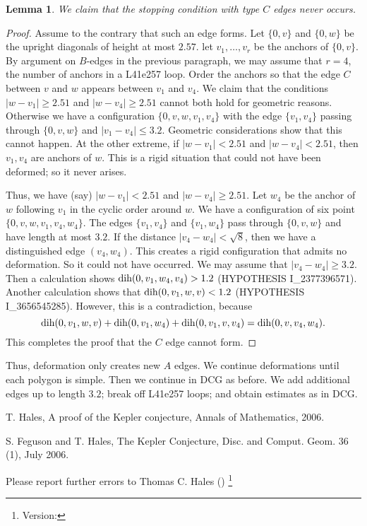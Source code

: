 \documentclass[11pt]{amsart}
\def\op#1{{\text{#1}}}
\def\text{\hbox}
\newtheorem{lemma}[subsubsection]{Lemma}
\begin{document}
\begin{lemma}
We claim that the stopping condition with type $C$ edges never
occurs.
\end{lemma}

\begin{proof}
Assume to the contrary that such an edge forms.
Let $\{0,v\}$ and $\{0,w\}$ be the upright diagonals of height at most
$2.57$.  let $v_1,\ldots,v_r$ be the anchors of $\{0,v\}$.  By argument on $B$-edges in the previous
paragraph, we may assume that $r=4$, the number of anchors in a L41e257 loop.  Order the anchors so
that the edge $C$ between $v$ and $w$ appears
between $v_1$ and $v_4$.  We claim that the
conditions $|w-v_1|\ge 2.51$ and $|w-v_4|\ge 2.51$ cannot
both hold for geometric reasons.
Otherwise we have a configuration $\{0,v,w,v_1,v_4\}$ with the edge $\{v_1,v_4\}$ passing through $\{0,v,w\}$ and $|v_1-v_4|\le 3.2$.  Geometric considerations show that this cannot happen.  At the other extreme, if $|w-v_1|<2.51$ and $|w-v_4|<2.51$, then $v_1,v_4$ are anchors of $w$.  This is a rigid situation that could not have been deformed; so it never arises.  

Thus, we have (say) $|w-v_1|<2.51$ and $|w-v_4|\ge 2.51$.  Let $w_4$ be the anchor of $w$ following $v_1$ in the cyclic order around $w$.
We have a configuration of six point $\{0,v,w,v_1,v_4,w_4\}$.  The edges $\{v_1,v_4\}$ and $\{v_1,w_4\}$ pass through $\{0,v,w\}$ and have length at most $3.2$.  If the distance $|v_4-w_4|<\sqrt8$, then we have a distinguished edge $(v_4,w_4)$.  This creates a rigid configuration that admits no deformation.  So it could not have occurred.  We may assume that $|v_4-w_4|\ge 3.2$.  Then a calculation shows $\op{dih}(0,v_1,w_4,v_4) > 1.2$ (HYPOTHESIS I\_2377396571).    Another calculation shows that
$\op{dih}(0,v_1,w,v) < 1.2$ (HYPOTHESIS I\_3656545285).  However, this is a contradiction, because
  $$
  \op{dih}(0,v_1,w,v)+\op{dih}(0,v_1,w_4) + \op{dih}(0,v_1,v,v_4) = \op{dih}(0,v,v_4,w_4).
  $$
This completes the proof that the $C$ edge cannot form.
\end{proof}



Thus, deformation only creates new $A$ edges.  We continue deformations until each polygon is simple.  Then we continue in DCG as before.  We add additional edges up to length $3.2$; break off L41e257 loops; and obtain estimates as in DCG.





\begin{thebibliography}{}

 {T. Hales}, A proof of the Kepler
	conjecture, Annals of Mathematics,
	2006.
	
 {S. Feguson and T. Hales},
	The Kepler Conjecture, Disc. and Comput.
	Geom. 36 (1), July 2006.


\end{thebibliography}

Please report further errors to
Thomas C. Hales ()%
\footnote{Version: \ver}
\end{document}
